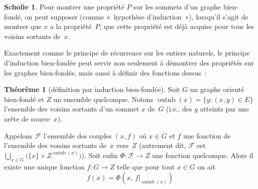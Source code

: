 \documentclass[12pt,a4paper]{article}
\theoremstyle{definition}
\newtheorem{thm}[comcnt]{Théorème}
\newtheorem{scho}[comcnt]{Scholie}
\newcommand{\outnb}{\operatorname{outnb}}
\begin{document}
\begin{scho}\label{scholion-well-founded-induction}
Pour montrer une propriété $P$ sur les sommets d'un graphe bien-fondé,
on peut supposer (comme « hypothèse d'induction »), lorsqu'il s'agit
de montrer que $x$ a la propriété $P$, que cette propriété est déjà
acquise pour tous les voisins sortants de $x$.
\end{scho}

Exactement comme le principe de récurrence sur les entiers naturels,
le principe d'induction bien-fondée peut servir non seulement à
démontrer des propriétés sur les graphes bien-fondés, mais aussi à
définir des fonctions dessus :

\begin{thm}[définition par induction bien-fondée]\label{well-founded-definition}
Soit $G$ un graphe orienté bien-fondé et $Z$ un ensemble quelconque.
Notons $\outnb(x) = \{y : (x,y) \in E\}$ l'ensemble des
voisins sortants d'un sommet $x$ de $G$ (i.e., des $y$ atteints par une
arête de source $x$).

Appelons $\mathscr{F}$ l'ensemble des couples $(x,f)$ où $x\in G$ et
$f$ une fonction de l'ensemble des voisins sortants de $x$ vers $Z$
(autrement dit, $\mathscr{F}$ est $\bigcup_{x \in G} \big(\{x\}\times
Z^{\outnb(x)}\big)$).  Soit enfin $\Phi\colon \mathscr{F} \to Z$
une fonction quelconque.  Alors il existe une unique fonction $f\colon
G \to Z$ telle que pour tout $x \in G$ on ait
\[
f(x) = \Phi(x,\, f|_{\outnb(x)})
\]
\end{thm}
\end{document}

